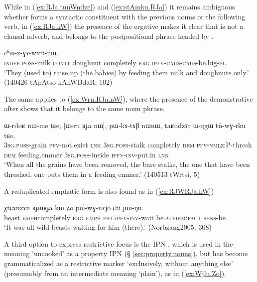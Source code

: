 While in (\ref{ex:RJa.tunWndze})  and (\ref{ex:stAmku.RJa}) it remains ambiguous whether  forms a syntactic constituent with the previous nouns or the following verb, in (\ref{ex:RJa.kW}) the presence of the ergative makes it clear that  is not a clausal adverb, and belongs to the postpositional phrase headed by .

\begin{exe}
\ex \label{ex:RJa.kW}
  cʰɯ-z-ɣɤ-wxti-nɯ. \\
 \textsc{indef}.\textsc{poss}-milk \textsc{comit} doughnut completely \textsc{erg} \textsc{ipfv}-\textsc{caus}-\textsc{caus}-be.big-\textsc{pl} \\
\glt `They (used to) raise up (the babies) by feeding them milk and doughnuts only.' (140426 tApAtso kAnWBdaR, 102)
\end{exe}

The same applies to (\ref{ex:Wru.RJa.nW}), where the presence of the demonstrative  after  shows that it belongs to the same noun phrase.

\begin{exe}
\ex \label{ex:Wru.RJa.nW}
 \gll ɯ-rdoʁ nɯ-me tɕe, [ɯ-ru ʁɟa nɯ], pɯ-kɤ-tɤβ nɯnɯ, taʁndzɤr ɯ-ŋgɯ tú-wɣ-rku tɕe, \\
 \textsc{3sg}.\textsc{poss}-grain \textsc{pfv}-not.exist \textsc{lnk} \textsc{3sg}.\textsc{poss}-stalk completely \textsc{dem} \textsc{pfv}-\textsc{nmlz}:P-thresh \textsc{dem} feeding.emmer \textsc{3sg}.\textsc{poss}-inside \textsc{ipfv}-\textsc{inv}-put.in \textsc{lnk} \\
 \glt `When all the grains have been removed, the bare stalks, the one that have been threshed, one puts them in a feeding emmer.' (140513 tWrtsi, 5)
\end{exe}

A reduplicated emphatic form  is also found as in (\ref{ex:RJWRJa.kW})

\begin{exe}
\ex \label{ex:RJWRJa.kW}
 \gll χtɕɤnzɤn ʁɟɯ\redp{}ʁɟa kɯ ʑo pɯ́-wɣ-nɤjo ɕti ɲɯ-ŋu.  \\
beast \textsc{emph}\redp{}completely \textsc{erg} \textsc{emph} \textsc{pst}.\textsc{ipfv}-\textsc{inv}-wait be.\textsc{affirm}:\textsc{fact} \textsc{sens}-be \\
\glt `It was all wild beasts waiting for him (there).' (Norbzang2005, 308)
 \end{exe}
 
A third option to express restrictive focus is the IPN , which is used in the meaning `uncooked' as a property IPN (§ \ref{sec:property.nouns}), but has become grammaticalized as a restrictive marker `exclusively, without anything else' (presumably from an intermediate meaning `plain'), as in (\ref{ex:Wjlu.Zo}).

